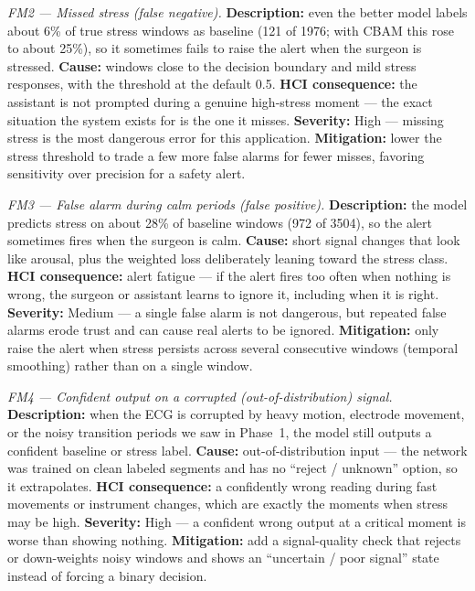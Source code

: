 \documentclass[conference]{IEEEtran}
\begin{document}
\textit{FM2 --- Missed stress (false negative).}
\textbf{Description:} even the better model labels about 6\% of true stress
windows as baseline (121 of 1976; with CBAM this rose to about 25\%), so it
sometimes fails to raise the alert when the surgeon is stressed.
\textbf{Cause:} windows close to the decision boundary and mild stress responses,
with the threshold at the default 0.5.
\textbf{HCI consequence:} the assistant is not prompted during a genuine
high-stress moment --- the exact situation the system exists for is the one it
misses.
\textbf{Severity:} High --- missing stress is the most dangerous error for this
application.
\textbf{Mitigation:} lower the stress threshold to trade a few more false alarms
for fewer misses, favoring sensitivity over precision for a safety alert.

\textit{FM3 --- False alarm during calm periods (false positive).}
\textbf{Description:} the model predicts stress on about 28\% of baseline windows
(972 of 3504), so the alert sometimes fires when the surgeon is calm.
\textbf{Cause:} short signal changes that look like arousal, plus the weighted
loss deliberately leaning toward the stress class.
\textbf{HCI consequence:} alert fatigue --- if the alert fires too often when
nothing is wrong, the surgeon or assistant learns to ignore it, including when it
is right.
\textbf{Severity:} Medium --- a single false alarm is not dangerous, but repeated
false alarms erode trust and can cause real alerts to be ignored.
\textbf{Mitigation:} only raise the alert when stress persists across several
consecutive windows (temporal smoothing) rather than on a single window.

\textit{FM4 --- Confident output on a corrupted (out-of-distribution) signal.}
\textbf{Description:} when the ECG is corrupted by heavy motion, electrode
movement, or the noisy transition periods we saw in Phase~1, the model still
outputs a confident baseline or stress label.
\textbf{Cause:} out-of-distribution input --- the network was trained on clean
labeled segments and has no ``reject / unknown'' option, so it extrapolates.
\textbf{HCI consequence:} a confidently wrong reading during fast movements or
instrument changes, which are exactly the moments when stress may be high.
\textbf{Severity:} High --- a confident wrong output at a critical moment is worse
than showing nothing.
\textbf{Mitigation:} add a signal-quality check that rejects or down-weights noisy
windows and shows an ``uncertain / poor signal'' state instead of forcing a binary
decision.
\end{document}
